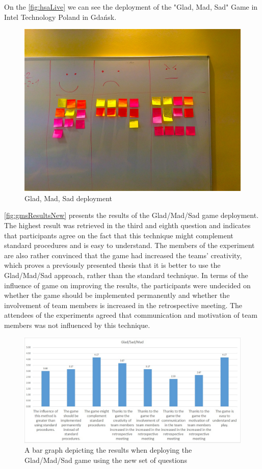 On the \autoref{fig:hsaLive} we can see the deployment of the "Glad, Mad, Sad" Game in Intel Technology Poland in Gdańsk.

\begin{figure}[!htbp]
\caption{Glad, Mad, Sad deployment}
\label{fig:hsaLive}
\centering
\includegraphics[width=1\textwidth]{live/hsaLive}
\end{figure}

\autoref{fig:gmsResultsNew} presents the results of the Glad/Mad/Sad game deployment. The highest result was retrieved in the third and eighth question and indicates that participants agree on the fact that this technique might complement standard procedures and is easy to understand. The members of the experiment are also rather convinced that the game had increased the teams' creativity, which proves a previously presented thesis that it is better to use the Glad/Mad/Sad approach, rather than the standard technique. In terms of the influence of game on improving the results, the participants were undecided on whether the game should be implemented permanently and whether the involvement of team members is increased in the retrospective meeting. The attendees of the experiments agreed that communication and motivation of team members was not influenced by this technique.    

\begin{figure}[!htbp]
\caption{A bar graph depicting the results when deploying the Glad/Mad/Sad game using the new set of questions}
\label{fig:gmsResultsNew}
\centering
\includegraphics[width=1\textwidth]{charts/gmdNewSet}
\end{figure}

